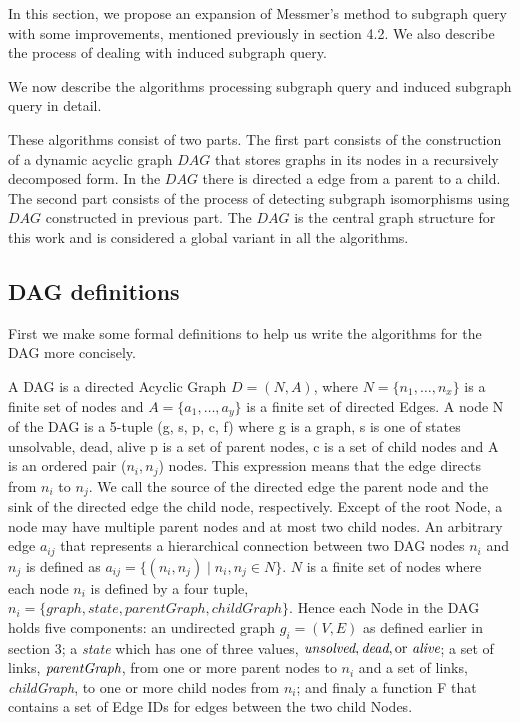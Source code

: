 In this section, we propose an expansion of Messmer's method to subgraph query with some improvements, mentioned previously in section 4.2.
We also describe the process of dealing with induced subgraph query.

We now describe the algorithms processing subgraph query and induced subgraph query in detail.

These algorithms consist of two parts. The first part consists of the construction of a dynamic acyclic graph $DAG$ that stores graphs in its nodes 
in a recursively decomposed form. In the $DAG$ there is directed a edge from a parent to a child. The second part consists of the process of 
detecting subgraph isomorphisms using $DAG$ constructed in previous part. The $DAG$ is the central graph structure for this work and is considered  a global variant in all the algorithms. 

\subsection{DAG definitions}
First we make some formal definitions to help us write the algorithms for the DAG more concisely.

A DAG is a directed Acyclic Graph $D=(N,A)$, where $N=\{n_1,\dots,n_x\}$  is a finite set of nodes and $A =\{a_1,\dots,a_y\}$ is a finite set of directed 
Edges. A node N of the DAG  is a 5-tuple (g, s, p, c, f)
where g is a graph, s is one of states {unsolvable, dead, alive} p is a set of parent nodes, c is a set of child nodes and A is an ordered pair ($n_{i},n_{j}$) 
nodes. This expression means that the edge directs from $n_i$ to $n_j$. We call the source of the directed edge the parent node and the sink of the directed
edge the child node, respectively. Except of the root Node, a node may have multiple parent nodes and at most two child nodes.
An arbitrary edge $a_{ij}$ that represents a hierarchical connection between two DAG nodes $n_i$ and $n_j$ is defined as $a_{ij}=\{(n_i,n_j)\mid n_i,n_j \in N\}$.
$N$ is a finite set of nodes where each node $n_{i}$ is defined by a four tuple,  $n_{i}=\{graph, state, parentGraph, childGraph\}$. Hence each Node in the 
DAG holds five components: an undirected graph $g_{i}=(V,E)$ as defined earlier in section 3; a \emph{state} which has one of three values, 
$\emph{unsolved}, \emph{dead}, \text{or }\emph{alive}$; a set of links,  $\emph{parentGraph}$, from one or more parent nodes to $n_i$ and 
a set of links, \emph{childGraph}, to one or more child nodes from $n_i$; and finaly a function F that contains a set of Edge IDs for edges between 
the two child Nodes.

